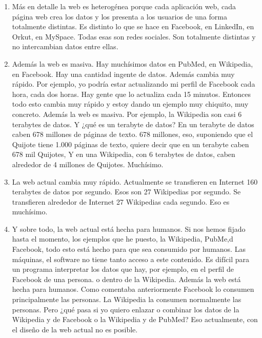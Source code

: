 \begin{enumerate}
	
	\item Más en detalle la web es heterogénea porque cada aplicación web, cada página web crea los datos y los presenta a los usuarios de una forma totalmente distintas. Es distinto lo que se hace en Facebook, en LinkedIn, en Orkut, en MySpace. Todas esas son redes sociales. Son totalmente distintas y no intercambian datos entre ellas.
	
	\item Además la web es masiva. Hay muchísimos datos en PubMed, en Wikipedia, en Facebook. Hay una cantidad ingente de datos. Además cambia muy rápido. Por ejemplo, yo podría estar actualizando mi perfil de Facebook cada hora, cada dos horas. Hay gente que lo actualiza cada 15 minutos. Entonces todo esto cambia muy rápido y estoy dando un ejemplo muy chiquito, muy concreto. Además la web es masiva. Por ejemplo, la Wikipedia son casi 6 terabytes de datos. Y ¿qué es un terabyte de datos? En un terabyte de datos caben 678 millones de páginas de texto. 678 millones, eso, suponiendo que el Quijote tiene 1.000 páginas de texto, quiere decir que en un terabyte caben 678 mil Quijotes, Y en una Wikipedia, con 6 terabytes de datos, caben alrededor de 4 millones de Quijotes. Muchísimo.
	
	\item La web actual cambia muy rápido. Actualmente se transfieren en Internet 160 terabytes de datos por segundo. Esos son 27 Wikipedias por segundo. Se transfieren alrededor de Internet 27 Wikipedias cada segundo. Eso es muchísimo.
	
	\item Y sobre todo, la web actual está hecha para humanos. Si nos hemos fijado hasta el momento, los ejemplos que he puesto, la Wikipedia, PubMe,d Facebook, todo esto está hecho para que sea consumido por humanos. Las máquinas, el software no tiene tanto acceso a este contenido. Es difícil para un programa interpretar los datos que hay, por ejemplo, en el perfil de Facebook de una persona. o dentro de la Wikipedia. Además la web está hecha para humanos. Como comentaba anteriormente Facebook lo consumen principalmente las personas. La Wikipedia la consumen normalmente las personas. Pero ¿qué pasa si yo quiero enlazar o combinar los datos de la Wikipedia y de Facebook o la Wikipedia y de PubMed? Eso actualmente, con el diseño de la web actual no es posible.
	

\end{enumerate}
